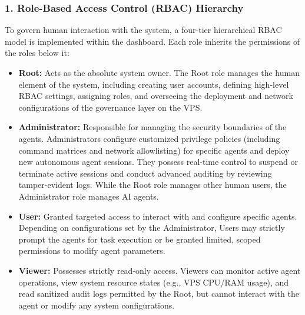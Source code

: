 \documentclass[a4paper]{report}
\begin{document}
\subsubsection*{1. Role-Based Access Control (RBAC) Hierarchy}
To govern human interaction with the system, a four-tier hierarchical RBAC model is implemented within the dashboard. Each role  inherits the permissions of the roles below it:
\begin{itemize}
    \item \textbf{Root:} Acts as the absolute system owner. The Root role manages the human element of the system, including creating user accounts, defining high-level RBAC settings, assigning roles, and overseeing the deployment and network configurations of the governance layer on the VPS.
    \item \textbf{Administrator:} Responsible for managing the security boundaries of the agents. Administrators configure customized privilege policies (including command matrices and network allowlisting) for specific agents and deploy new autonomous agent sessions. They possess real-time control to suspend or terminate active sessions and conduct advanced auditing by reviewing tamper-evident logs. While the Root role manages other human users, the Administrator role manages AI agents.
    \item \textbf{User:} Granted targeted access to interact with and configure specific agents. Depending on configurations set by the Administrator, Users may strictly prompt the agents for task execution or be granted limited, scoped permissions to modify agent parameters.
    \item \textbf{Viewer:} Possesses strictly read-only access. Viewers can monitor active agent operations, view system resource states (e.g., VPS CPU/RAM usage), and read sanitized audit logs permitted by the Root, but cannot interact with the agent or modify any system configurations.
\end{itemize}
\end{document}
